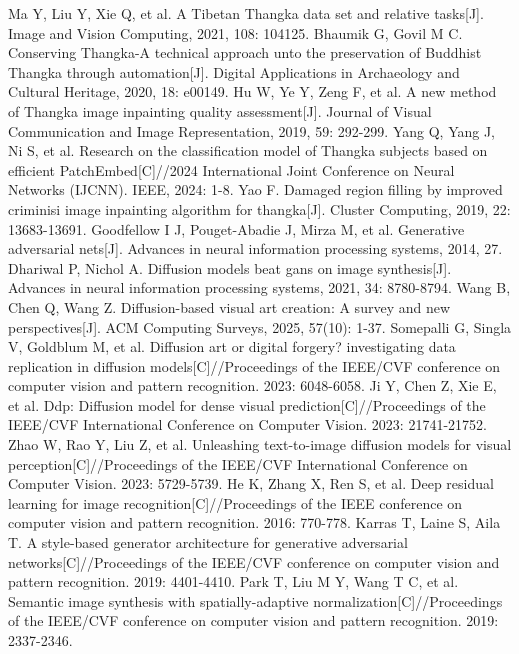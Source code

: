 \documentclass[sn-mathphys]{sn-jnl}%
\theoremstyle{thmstyleone}%
\theoremstyle{thmstyletwo}%
\theoremstyle{thmstylethree}%
\begin{document}
\begin{thebibliography}{00}
	 Ma Y, Liu Y, Xie Q, et al. A Tibetan Thangka data set and relative tasks[J]. Image and Vision Computing, 2021, 108: 104125.
	 Bhaumik G, Govil M C. Conserving Thangka-A technical approach unto the preservation of Buddhist Thangka through automation[J]. Digital Applications in Archaeology and Cultural Heritage, 2020, 18: e00149.
	 Hu W, Ye Y, Zeng F, et al. A new method of Thangka image inpainting quality assessment[J]. Journal of Visual Communication and Image Representation, 2019, 59: 292-299.
	 Yang Q, Yang J, Ni S, et al. Research on the classification model of Thangka subjects based on efficient PatchEmbed[C]//2024 International Joint Conference on Neural Networks (IJCNN). IEEE, 2024: 1-8.
	 Yao F. Damaged region filling by improved criminisi image inpainting algorithm for thangka[J]. Cluster Computing, 2019, 22: 13683-13691.
	 Goodfellow I J, Pouget-Abadie J, Mirza M, et al. Generative adversarial nets[J]. Advances in neural information processing systems, 2014, 27.
	 Dhariwal P, Nichol A. Diffusion models beat gans on image synthesis[J]. Advances in neural information processing systems, 2021, 34: 8780-8794.
	 Wang B, Chen Q, Wang Z. Diffusion-based visual art creation: A survey and new perspectives[J]. ACM Computing Surveys, 2025, 57(10): 1-37.
	 Somepalli G, Singla V, Goldblum M, et al. Diffusion art or digital forgery? investigating data replication in diffusion models[C]//Proceedings of the IEEE/CVF conference on computer vision and pattern recognition. 2023: 6048-6058.
	 Ji Y, Chen Z, Xie E, et al. Ddp: Diffusion model for dense visual prediction[C]//Proceedings of the IEEE/CVF International Conference on Computer Vision. 2023: 21741-21752.
	 Zhao W, Rao Y, Liu Z, et al. Unleashing text-to-image diffusion models for visual perception[C]//Proceedings of the IEEE/CVF International Conference on Computer Vision. 2023: 5729-5739.
	 He K, Zhang X, Ren S, et al. Deep residual learning for image recognition[C]//Proceedings of the IEEE conference on computer vision and pattern recognition. 2016: 770-778.
	 Karras T, Laine S, Aila T. A style-based generator architecture for generative adversarial networks[C]//Proceedings of the IEEE/CVF conference on computer vision and pattern recognition. 2019: 4401-4410.
	 Park T, Liu M Y, Wang T C, et al. Semantic image synthesis with spatially-adaptive normalization[C]//Proceedings of the IEEE/CVF conference on computer vision and pattern recognition. 2019: 2337-2346.

\end{thebibliography}
\end{document}
